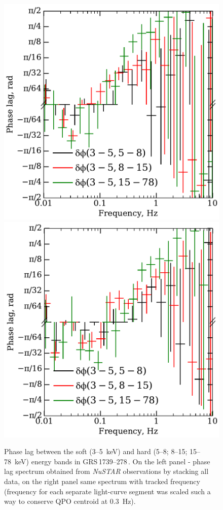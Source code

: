 \documentclass[a4paper,fleqn,usenatbib]{mnras}
\def\grs{{GRS\,1739--278\,}}
\begin{document}
\begin{figure}
        \includegraphics[width=0.99\columnwidth]{phase_lag_untracked.pdf}
        \includegraphics[width=0.99\columnwidth]{phase_lag_new.pdf}
        \caption{Phase lag between the soft (3--5~keV) and hard (5--8; 8--15; 15--78~keV) energy bands in \grs. 
        On the left panel - phase lag spectrum obtained from {\it NuSTAR} observations by stacking all data, on the right panel same spectrum with tracked frequency (frequency for each separate light-curve segment was scaled such a way to conserve QPO centroid at 0.3~Hz).}
        \label{fig:phase_lag}
\end{figure}
\end{document}
